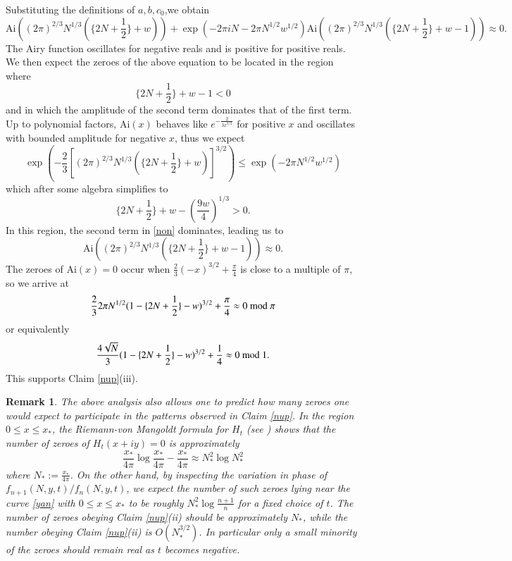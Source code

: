 \documentclass[a4paper,11pt,twoside]{amsart}
\newtheorem{remark}[theorem]{Remark}
\begin{document}
Substituting the definitions of $a,b,c_0$,we obtain
\begin{equation}\label{non}
 \mathrm{Ai}( (2\pi)^{2/3} N^{1/3} ( \{ 2N + \frac{1}{2}\} + w ) ) + \exp( -2\pi i N - 2 \pi N^{1/2} w^{1/2}  )
\mathrm{Ai}( (2\pi)^{2/3} N^{1/3} ( \{ 2N + \frac{1}{2}\} + w - 1) ) \approx 0.
\end{equation}
The Airy function oscillates for negative reals and is positive for positive reals.  We then expect the zeroes of the above equation to be located in the region where
$$ \{ 2N + \frac{1}{2}\} + w - 1 < 0$$
and in which the amplitude of the second term dominates that of the first term. Up to polynomial factors, $\mathrm{Ai}(x)$ behaves like $e^{-\frac{2}{3x^{3/2}}}$ for positive $x$ and oscillates with bounded amplitude for negative $x$, thus we expect
$$ \exp( -\frac{2}{3} [ (2\pi)^{2/3} N^{1/3} ( \{ 2N + \frac{1}{2}\} + w ) ]^{3/2} ) \leq
\exp( -2 \pi N^{1/2} w^{1/2} )$$
which after some algebra simplifies to
$$ \{ 2N + \frac{1}{2} \} + w - (\frac{9w}{4})^{1/3} > 0.$$
In this region, the second term in \eqref{non} dominates, leading us to
$$ \mathrm{Ai}( (2\pi)^{2/3} N^{1/3} ( \{ 2N + \frac{1}{2}\} + w - 1) ) \approx 0.$$
The zeroes of $\mathrm{Ai}(x)=0$ occur when $\frac{2}{3} (-x)^{3/2} + \frac{\pi}{4}$ is close to a multiple of $\pi$, so we arrive at
$$ \frac{2}{3} 2 \pi N^{1/2} (1 - \{ 2N + \frac{1}{2}\} - w)^{3/2} + \frac{\pi}{4} \approx 0 \hbox{ mod } \pi $$
or equivalently
$$ \frac{4 \sqrt{N}}{3} (1 - \{ 2N + \frac{1}{2}\} - w)^{3/2} + \frac{1}{4} \approx 0 \hbox{ mod } 1 .$$
This supports Claim \ref{nup}(iii).


\begin{remark}  The above analysis also allows one to predict how many zeroes one would expect to participate in the patterns observed in Claim \ref{nup}.  In the region $0 \leq x \leq x_*$, the Riemann-von Mangoldt formula for $H_t$ (see \cite[Theorem 4.2]{brad}) shows that the number of zeroes of $H_t(x+iy)=0$ is approximately
$$ \frac{x_*}{4\pi} \log \frac{x_*}{4\pi} - \frac{x_*}{4\pi} \approx N_*^2 \log N_*^2 $$
where $N_* := \frac{x_*}{4\pi}$.  On the other hand, by inspecting the variation in phase of $f_{n+1}(N,y,t)/f_n(N,y,t)$, we expect the number of such zeroes lying near the curve \eqref{yan} with $0 \leq x \leq x_*$ to be roughly $N_*^2 \log \frac{n+1}{n}$ for a fixed choice of $t$.  The number of zeroes obeying Claim \ref{nup}(ii) should be approximately $N_*$, while the number obeying Claim \ref{nup}(ii) is $O( N_*^{3/2})$.  In particular only a small minority of the zeroes should remain real as $t$ becomes negative.
\end{remark}
\end{document}
